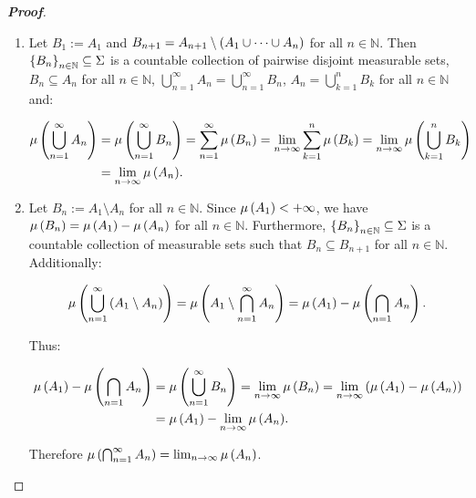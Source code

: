 \begin{proposition}
\begin{proof}[\rm\textbf{Proof}]
\begin{enumerate}
      \begin{equation}
        \mu\pr{\bigcup_{n=1}^{\infty}{A_n}}=\mu\pr{\bigcup_{n=1}^{\infty}{B_n}}=\sum_{n=1}^{\infty}{\mu\pr{B_n}}\leq\sum_{n=1}^{\infty}{\mu\pr{A_n}}.
      \end{equation}

      \item Let $B_1:=A_1$ and $B_{n+1}=A_{n+1}\setminus\left(A_1\cup\dots\cup A_n\right)$ for all $n\in\mathbb{N}$. Then $\left\{B_n\right\}_{n\in\mathbb{N}}\subseteq\Sigma$ is a countable collection of pairwise disjoint measurable sets, $B_n\subseteq A_n$ for all $n\in\mathbb{N}$, $\bigcup_{n=1}^{\infty}{A_n}=\bigcup_{n=1}^{\infty}{B_n}$, $A_n=\bigcup_{k=1}^{n}{B_k}$ for all $n\in\mathbb{N}$ and:
      
      \begin{equation}
        \begin{split}
          \mu\left(\bigcup_{n=1}^{\infty}{A_n}\right) & =\mu\left(\bigcup_{n=1}^{\infty}{B_n}\right)=\sum_{n=1}^{\infty}{\mu\left(B_n\right)}=\lim_{n\to\infty}{\sum_{k=1}^{n}{\mu\left(B_k\right)}}=\lim_{n\to\infty}{\mu\left(\bigcup_{k=1}^{n}{B_k}\right)}\\
          & =\lim_{n\to\infty}{\mu\left(A_n\right)}.
        \end{split}
      \end{equation}

      \item Let $B_n:=A_1\setminus A_n$ for all $n\in\mathbb{N}$. Since $\mu\left(A_1\right)<+\infty$, we have $\mu\left(B_n\right)=\mu\left(A_1\right)-\mu\left(A_n\right)$ for all $n\in\mathbb{N}$. Furthermore, $\left\{B_n\right\}_{n\in\mathbb{N}}\subseteq\Sigma$ is a countable collection of measurable sets such that $B_n\subseteq B_{n+1}$ for all $n\in\mathbb{N}$. Additionally:
      
      \begin{equation}
        \mu\left(\bigcup_{n=1}^{\infty}{\left(A_1\setminus A_n\right)}\right)=\mu\left(A_1\setminus\bigcap_{n=1}^{\infty}{A_n}\right)=\mu\left(A_1\right)-\mu\left(\bigcap_{n=1}{A_n}\right).
      \end{equation}
      
      Thus:
      

      \begin{equation}
        \begin{split}
          \mu\left(A_1\right)-\mu\left(\bigcap_{n=1}{A_n}\right) & =\mu\left(\bigcup_{n=1}^{\infty}{B_n}\right)=\lim_{n\to\infty}{\mu\left(B_n\right)}=\lim_{n\to\infty}{\left(\mu\left(A_1\right)-\mu\left(A_n\right)\right)}\\
          & =\mu\left(A_1\right)-\lim_{n\to\infty}{\mu\left(A_n\right)}.
        \end{split}
      \end{equation}

      Therefore $\mu\left(\bigcap_{n=1}^{\infty}{A_n}\right)=\lim_{n\to\infty}{\mu\left(A_n\right)}$.
    \end{enumerate}
  \end{proof}
\end{proposition}

